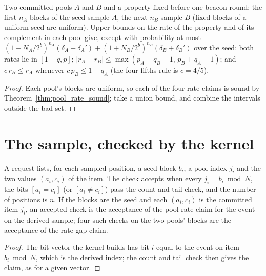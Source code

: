 \begin{theorem}\label{thm:rate_gap}
\leanok
{}
Two committed pools $A$ and $B$ and a property fixed before one beacon round; the first $n_A$
blocks of the seed sample $A$, the next $n_B$ sample $B$ (fixed blocks of a uniform seed are
uniform). Upper bounds on the rate of the property and of its complement in each pool give, except
with probability at most $(1+N_A/2^b)^{n_A}(\delta_A+\delta_A')+(1+N_B/2^b)^{n_B}(\delta_B+\delta_B')$
over the seed: both rates lie in $[1-q,p]$; $|r_A-r_B|\le\max(p_A+q_B-1,\,p_B+q_A-1)$; and
$c\,r_B\le r_A$ whenever $c\,p_B\le 1-q_A$ (the four-fifths rule is $c=4/5$).
\end{theorem}
\begin{proof}
\leanok
Each pool's blocks are uniform, so each of the four rate claims is sound by
Theorem~\ref{thm:pool_rate_sound}; take a union bound, and combine the intervals outside the bad set.
\end{proof}

\section{The sample, checked by the kernel}

\begin{theorem}\label{thm:pool_sample}
\leanok
{}
A request lists, for each sampled position, a seed block $b_i$, a pool index $j_i$ and the two
values $(a_i, c_i)$ of the item. The check accepts when every $j_i = b_i \bmod N$, the bits
$[a_i = c_i]$ (or $[a_i \ne c_i]$) pass the count and tail check, and the number of positions is
$n$. If the blocks are the seed and each $(a_i, c_i)$ is the committed item $j_i$, an accepted check
is the acceptance of the pool-rate claim for the event on the derived sample; four such checks on
the two pools' blocks are the acceptance of the rate-gap claim.
\end{theorem}
\begin{proof}
\leanok
The bit vector the kernel builds has bit $i$ equal to the event on item $b_i \bmod N$, which is the
derived index; the count and tail check then gives the claim, as for a given vector.
\end{proof}

